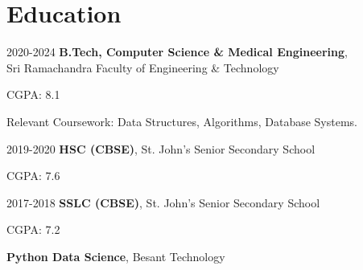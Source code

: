 \section{Education}
\begin{twocolentry}{2020-2024}
\textbf{B.Tech, Computer Science \& Medical Engineering}, \\Sri Ramachandra Faculty of Engineering \& Technology
\end{twocolentry}
\vspace{0.10 cm}
\begin{onecolentry}
\begin{highlights}
\item CGPA: 8.1
\item Relevant Coursework:  Data Structures, Algorithms, Database Systems.
\end{highlights}
\end{onecolentry}
\vspace{0.10 cm}
\begin{twocolentry}{2019-2020}
\textbf{HSC (CBSE)}, St. John’s Senior Secondary School
\end{twocolentry}
\vspace{0.10 cm}
\begin{onecolentry}
\begin{highlights}
\item CGPA: 7.6
\end{highlights}
\end{onecolentry}
\vspace{0.10 cm}
\begin{twocolentry}{2017-2018}
\textbf{SSLC (CBSE)}, St. John’s Senior Secondary School
\end{twocolentry}
\vspace{0.10 cm}
\begin{onecolentry}
\begin{highlights}
\item CGPA: 7.2
\end{highlights}
\end{onecolentry}
\vspace{0.10 cm}
\begin{twocolentry}{}
\textbf{Python Data Science}, Besant Technology
\end{twocolentry}



